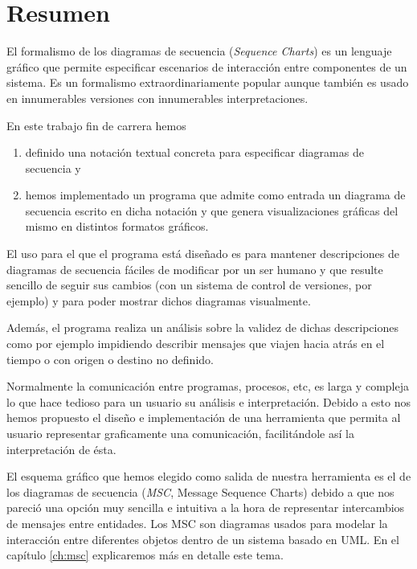 \chapter*{Resumen}

El formalismo de los diagramas de secuencia (\emph{Sequence Charts})
es un lenguaje gráfico que permite especificar escenarios de
interacción entre componentes de un sistema. Es un formalismo extraordinariamente popular
aunque también es usado en innumerables versiones con innumerables
interpretaciones.

En este trabajo fin de carrera hemos
\begin{enumerate}
\item definido una notación textual concreta para especificar diagramas de
  secuencia y
\item hemos implementado un programa que admite como entrada un
  diagrama de secuencia escrito en dicha notación y que genera
  visualizaciones gráficas del mismo en distintos formatos gráficos.
\end{enumerate}

El uso para el que el programa está diseñado es para mantener
descripciones de diagramas de secuencia fáciles de modificar por un
ser humano y que resulte sencillo de seguir sus cambios (con un
sistema de control de versiones, por ejemplo) y para poder mostrar
dichos diagramas visualmente.

Además, el programa realiza un análisis sobre la validez de dichas
descripciones como por ejemplo impidiendo describir mensajes que
viajen hacia atrás en el tiempo o con origen o destino no definido.


Normalmente la comunicación entre programas, procesos, etc, es larga y
compleja lo que hace tedioso para un usuario su análisis e
interpretación. Debido a esto nos hemos propuesto el diseño e
implementación de una herramienta que permita al usuario representar
graficamente una comunicación, facilitándole así la interpretación de
ésta. 

El esquema gráfico que hemos elegido como salida de nuestra
herramienta es el de los diagramas de secuencia (\textit{MSC}, Message
Sequence Charts) debido a que nos pareció una opción muy sencilla e
intuitiva a la hora de representar intercambios de mensajes entre
entidades. Los MSC son diagramas usados para modelar la interacción
entre diferentes objetos dentro de un sistema basado en UML. En el
capítulo \ref{ch:msc} explicaremos más en detalle este tema.

